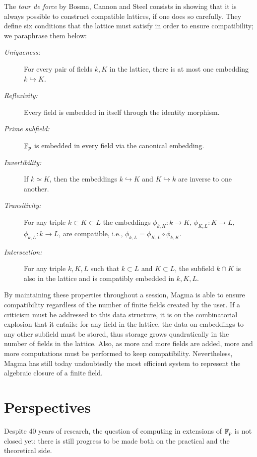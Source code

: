 \documentclass[b5layout]{hdr}
\begin{document}
The \emph{tour de force} by Bosma, Cannon and Steel consists in
showing that it is always possible to construct compatible lattices,
if one does so carefully. %
They define six conditions that the lattice must satisfy in order to
ensure compatibility; we paraphrase them below:
\begin{description}
\item[\emph{Uniqueness:}] For every pair of fields $k,K$ in the lattice,
  there is at most one embedding $k\hookrightarrow K$.
\item[\emph{Reflexivity:}] Every field is embedded in itself through
  the identity morphism.
\item[\emph{Prime subfield:}] $\mathbb{F}_p$ is embedded in every field via the
  canonical embedding.
\item[\emph{Invertibility:}] If $k≃K$, then the embeddings
  $k\hookrightarrow K$ and $K\hookrightarrow k$ are inverse to one
  another.
\item[\emph{Transitivity:}] For any triple $k⊂K⊂L$ the embeddings
  $ϕ_{k,K}:k→K$, $ϕ_{K,L}:K→L$, $ϕ_{k,L}:k→L$, are compatible, i.e.,
  $ϕ_{k,L}=ϕ_{K,L}∘ϕ_{k,K}$.
\item[\emph{Intersection:}] For any triple $k,K,L$ such that $k⊂L$ and
  $K⊂L$, the subfield $k∩K$ is also in the lattice and is compatibly
  embedded in $k,K,L$.
\end{description}

By maintaining these properties throughout a session, Magma is able to
ensure compatibility regardless of the number of finite fields created
by the user. %
If a criticism must be addressed to this data structure, it is on the
combinatorial explosion that it entails: for any field in the lattice,
the data on embeddings to any other subfield must be stored, thus
storage grows quadratically in the number of fields in the lattice. %
Also, as more and more fields are added, more and more computations
must be performed to keep compatibility. %
Nevertheless, Magma has still today undoubtedly the most efficient
system to represent the algebraic closure of a finite field. %


\section{Perspectives}

Despite 40 years of research, the question of computing in extensions
of $\mathbb{F}_p$ is not closed yet: there is still progress to be made both
on the practical and the theoretical side. %
\end{document}
